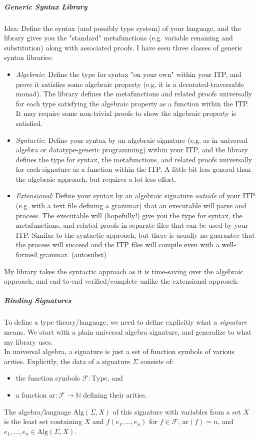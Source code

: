 \documentclass{article}
\theoremstyle{definition}
\begin{document}
\subparagraph{Generic Syntax Library} Idea: Define the syntax (and possibly type system) of your language, and the library gives you the "standard" metafunctions (e.g. variable renaming and substitution) along with associated proofs. I have seen three classes of generic syntax libraries:
\begin{itemize}
	\item \emph{Algebraic}: Define the type for syntax "on your own" within your ITP, and prove it satisfies some algebraic property (e.g. it is a decorated-traversable monad). The library defines the metafunctions and related proofs universally for each type satisfying the algebraic property as a function within the ITP. It may require some non-trivial proofs to show the algebraic property is satisfied.
	\item \emph{Syntactic}: Define your syntax by an algebraic signature (e.g. as in universal algebra or datatype-generic programming) within your ITP, and the library defines the type for syntax, the metafunctions, and related proofs universally for each signature as a function within the ITP. A little bit less general than the algebraic approach, but requires a lot less effort.
	\item \emph{Extensional}: Define your syntax by an algebraic signature \emph{outside} of your ITP (e.g. with a text file defining a grammar) that an executable will parse and process. The executable will (hopefully!) give you the type for syntax, the metafunctions, and related proofs in separate files that can be used by your ITP. Similar to the syntactic approach, but there is usually no guarantee that the process will succeed and the ITP files will compile even with a well-formed grammar. (autosubst)
\end{itemize}
My library takes the syntactic approach as it is time-saving over the algebraic approach, and end-to-end verified/complete unlike the extensional approach.

\subparagraph{Binding Signatures} To define a type theory/language, we need to define explicitly what a \emph{signature} means. We start with a plain universal algebra signature, and generalize to what my library uses.\\

In universal algebra, a signature is just a set of function symbols of various arities. Explicitly, the data of a signature $\Sigma$ consists of:
\begin{itemize}
	\item the function symbols $\mathcal{F} : \text{Type}$, and
	\item a function $\text{ar} : \mathcal{F} \rightarrow \mathbb{N}$ defining their arities.
\end{itemize}
The algebra/language $\text{Alg}(\Sigma,X)$ of this signature with variables from a set $X$ is the least set containing $X$ and $f(e_1,\ldots,e_n)$ for $f \in \mathcal{F}$, $\text{ar}(f) = n$, and $e_1,\ldots,e_n \in \text{Alg}(\Sigma,X)$. \\
\end{document}
